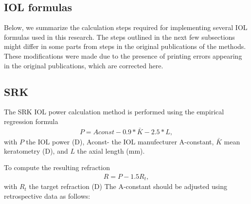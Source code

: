 \documentclass[article,twocolumn,preprint,10pt]{paper}%
\renewcommand{\(}{\left(}
\renewcommand{\)}{\right)}
\renewcommand{\[}{\left[}
\renewcommand{\]}{\right]}
\newcommand{\beq}{\begin{eqnarray}}
\newcommand{\eeq}{\end{eqnarray}}
\newcommand{\1}{\mbox{\boldmath$1$}}
\begin{document}
\subsection{IOL formulas}
Below, we summarize the calculation steps required for implementing several IOL formulas used in this research. The steps outlined in the next few subsections might differ in some parts from steps in the original publications of the methods. These modifications were made due to the presence of printing errors appearing in the original publications, which are corrected here.

\subsection{SRK}\label{subsection:srk}
The SRK IOL power calculation method is performed using the empirical regression formula
\beq
P = Aconst-0.9*\bar{K}-2.5*L,
\eeq 
with $P$ the IOL power (D), Aconst- the IOL manufecturer A-constant, $\bar{K}$ mean keratometry (D), and $L$ the axial length (mm).

To compute the resulting refraction 
\beq
R = P-1.5R_t,
\eeq 
with $R_t$ the target refraction (D)
The A-constant should be adjusted using retrospective data as follows:
\end{document}

